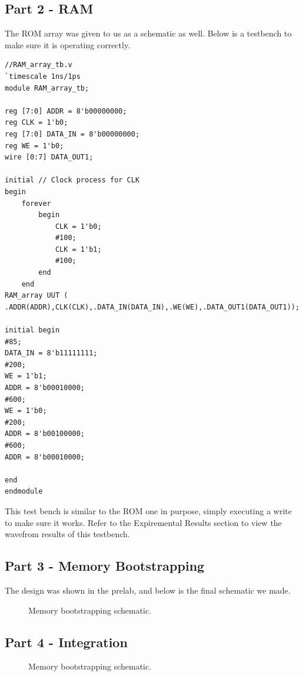\documentclass[12pt]{article}
\begin{document}
		\subsection{Part 2 - RAM}
		The ROM array was given to us as a schematic as well. Below is a testbench to make sure it is operating correctly.

		\begin{Verbatim}[frame=single, fontsize= \small]
//RAM_array_tb.v
`timescale 1ns/1ps
module RAM_array_tb;

reg [7:0] ADDR = 8'b00000000;
reg CLK = 1'b0;
reg [7:0] DATA_IN = 8'b00000000;
reg WE = 1'b0;
wire [0:7] DATA_OUT1;

initial // Clock process for CLK
begin
	forever 
		begin
			CLK = 1'b0;
			#100;
			CLK = 1'b1; 
			#100;
		end
	end
RAM_array UUT (
.ADDR(ADDR),CLK(CLK),.DATA_IN(DATA_IN),.WE(WE),.DATA_OUT1(DATA_OUT1));

initial begin
#85;
DATA_IN = 8'b11111111;
#200;
WE = 1'b1;
ADDR = 8'b00010000;
#600;
WE = 1'b0;
#200;
ADDR = 8'b00100000;
#600;
ADDR = 8'b00010000;

end
endmodule
		\end{Verbatim}
		This test bench is similar to the ROM one in purpose, simply executing a write to make sure it works. Refer to the Expiremental Results section to view the wavefrom results of this testbench.


		\subsection{Part 3 - Memory Bootstrapping}
		The design was shown in the prelab, and below is the final schematic we made.

		\begin{figure}[h]
			\caption{Memory bootstrapping schematic.}
		\end{figure}



		\subsection{Part 4 - Integration}

		\begin{figure}[h]
			\caption{Memory bootstrapping schematic.}
		\end{figure}
\end{document}

